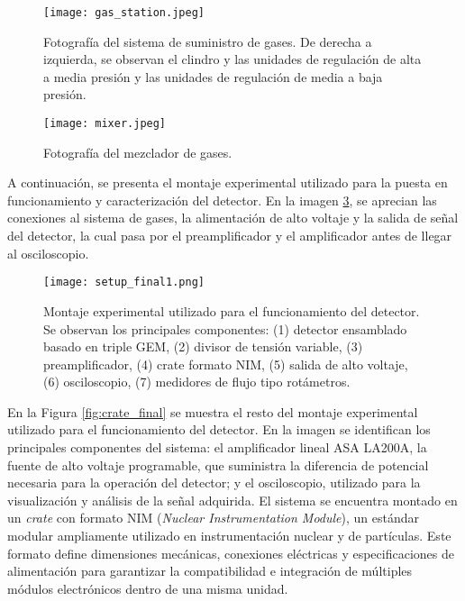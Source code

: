 \documentclass{report}
\begin{document}
\begin{figure}[H]
    \centering
    \texttt{[image: gas\_station.jpeg]}
    \caption{Fotografía del sistema de suministro de gases. De derecha a izquierda, se observan el clindro y las unidades de regulación de alta a media presión y las unidades de regulación de media a baja presión.}
    \label{fig:gas_station}
\end{figure}

\begin{figure}[H]
    \centering
    \texttt{[image: mixer.jpeg]}
    \caption{Fotografía del mezclador de gases.}
    \label{fig:mixer}
\end{figure}
\newpage

\noindent A continuación, se presenta el montaje experimental utilizado para la puesta en funcionamiento y caracterización del detector. En la imagen \ref{fig:setup}, se aprecian las conexiones al sistema de gases, la alimentación de alto voltaje y la salida de señal del detector, la cual pasa por el preamplificador y el amplificador antes de llegar al osciloscopio.\\

\begin{figure}[H]
    \centering
    \texttt{[image: setup\_final1.png]}
    \caption{Montaje experimental utilizado para el funcionamiento del detector. Se observan los principales componentes: (1) detector ensamblado basado en triple GEM, (2) divisor de tensión variable, (3) preamplificador, (4) crate formato NIM, (5) salida de alto voltaje, (6) osciloscopio, (7) medidores de flujo tipo rotámetros.}
    \label{fig:setup}
\end{figure}

\noindent En la Figura \ref{fig:crate_final} se muestra el resto del montaje experimental utilizado para el funcionamiento del detector. En la imagen se identifican los principales componentes del sistema: el amplificador lineal ASA LA200A, la fuente de alto voltaje programable, que suministra la diferencia de potencial necesaria para la operación del detector; y el osciloscopio, utilizado para la visualización y análisis de la señal adquirida. El sistema se encuentra montado en un \textit{crate} con formato NIM (\textit{Nuclear Instrumentation Module}), un estándar modular ampliamente utilizado en instrumentación nuclear y de partículas. Este formato define dimensiones mecánicas, conexiones eléctricas y especificaciones de alimentación para garantizar la compatibilidad e integración de múltiples módulos electrónicos dentro de una misma unidad.  \\
\end{document}

